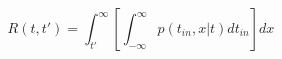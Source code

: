\begin{equation}
R(t,t') = \int_{t'}^\infty \left[ \int_{-\infty}^\infty p(t_{in},x|t) dt_{in} \right]  dx
\end{equation}